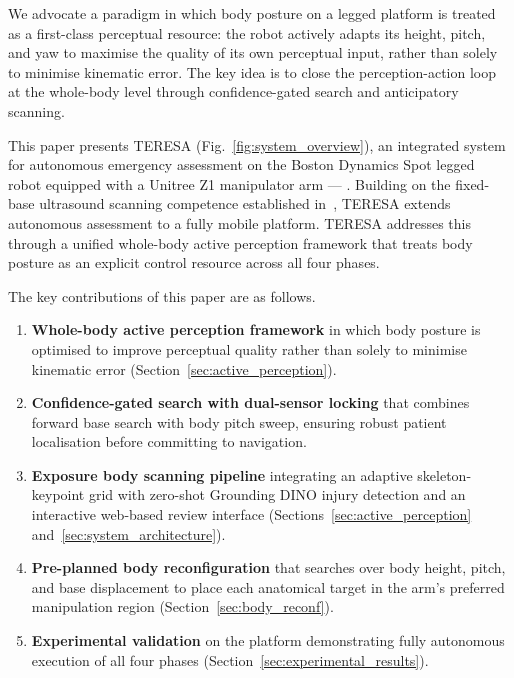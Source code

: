 
We advocate a paradigm in which body posture on a legged
platform is treated as a first-class perceptual resource: the robot actively
adapts its height, pitch, and yaw to maximise the quality of its own
perceptual input, rather than solely to minimise kinematic error. The key
idea is to close the perception-action loop at the whole-body level through
confidence-gated search and anticipatory scanning.


This paper presents \acf{TERESA} (Fig.~\ref{fig:system_overview}), an integrated
system for autonomous emergency assessment on the Boston Dynamics Spot legged
robot equipped with a Unitree Z1 manipulator arm --- .
Building on the fixed-base ultrasound scanning competence
established in~\cite{farsoni2025autonomous}, \ac{TERESA} extends autonomous
assessment to a fully mobile platform.  \ac{TERESA} addresses this through a unified whole-body active
perception framework that treats body posture as an explicit control resource
across all four phases.


The key contributions of this paper are as follows.
\begin{enumerate}
  \item \textbf{Whole-body active perception framework} in which body
        posture is optimised to improve perceptual quality rather than
        solely to minimise kinematic error
        (Section~\ref{sec:active_perception}).
  \item \textbf{Confidence-gated search with dual-sensor locking} that
        combines forward base search with body pitch sweep, ensuring robust
        patient localisation before committing to navigation.
  \item \textbf{Exposure body scanning pipeline} integrating an adaptive
        skeleton-keypoint grid with zero-shot Grounding DINO injury
        detection and an interactive web-based review interface
        (Sections~\ref{sec:active_perception}
        and~\ref{sec:system_architecture}).
  \item \textbf{Pre-planned body reconfiguration} that searches over body
        height, pitch, and base displacement to place each anatomical target
        in the arm's preferred manipulation region
        (Section~\ref{sec:body_reconf}).
  \item \textbf{Experimental validation} on the 
        platform demonstrating fully autonomous execution of all four phases
        (Section~\ref{sec:experimental_results}).
\end{enumerate}

